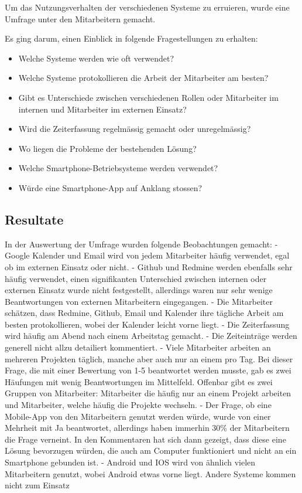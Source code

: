\documentclass[]{article}
\begin{document}
Um das Nutzungsverhalten der verschiedenen Systeme zu erruieren, wurde
eine Umfrage unter den Mitarbeitern gemacht.

Es ging darum, einen Einblick in folgende Fragestellungen zu erhalten:

\begin{itemize}
\itemsep1pt\parskip0pt
\item
  Welche Systeme werden wie oft verwendet?
\item
  Welche Systeme protokollieren die Arbeit der Mitarbeiter am besten?
\item
  Gibt es Unterschiede zwischen verschiedenen Rollen oder Mitarbeiter im
  internen und Mitarbeiter im externen Einsatz?
\item
  Wird die Zeiterfassung regelmässig gemacht oder unregelmässig?
\item
  Wo liegen die Probleme der bestehenden Lösung?
\item
  Welche Smartphone-Betriebsysteme werden verwendet?
\item
  Würde eine Smartphone-App auf Anklang stossen?
\end{itemize}

\subsection{Resultate}\label{resultate}

In der Auswertung der Umfrage wurden folgende Beobachtungen gemacht: -
Google Kalender und Email wird von jedem Mitarbeiter häufig verwendet,
egal ob im externen Einsatz oder nicht. - Github und Redmine werden
ebenfalls sehr häufig verwendet, einen signifikanten Unterschied
zwischen internen oder externen Einsatz wurde nicht festgestellt,
allerdings waren nur sehr wenige Beantwortungen von externen
Mitarbeitern eingegangen. - Die Mitarbeiter schätzen, dass Redmine,
Github, Email und Kalender ihre tägliche Arbeit am besten
protokollieren, wobei der Kalender leicht vorne liegt. - Die
Zeiterfassung wird häufig am Abend nach einem Arbeitstag gemacht. - Die
Zeiteinträge werden generell nicht allzu detailiert kommentiert. - Viele
Mitarbeiter arbeiten an mehreren Projekten täglich, manche aber auch nur
an einem pro Tag. Bei dieser Frage, die mit einer Bewertung von 1-5
beantwortet werden musste, gab es zwei Häufungen mit wenig
Beantwortungen im Mittelfeld. Offenbar gibt es zwei Gruppen von
Mitarbeiter: Mitarbeiter die häufig nur an einem Projekt arbeiten und
Mitarbeiter, welche häufig die Projekte wechseln. - Der Frage, ob eine
Mobile-App von den Mitarbeitern genutzt werden würde, wurde von einer
Mehrheit mit Ja beantwortet, allerdings haben immerhin 30\% der
Mitarbeitern die Frage verneint. In den Kommentaren hat sich dann
gezeigt, dass diese eine Lösung bevorzugen würden, die auch am Computer
funktioniert und nicht an ein Smartphone gebunden ist. - Android und IOS
wird von ähnlich vielen Mitarbeitern genutzt, wobei Android etwas vorne
liegt. Andere Systeme kommen nicht zum Einsatz
\end{document}

